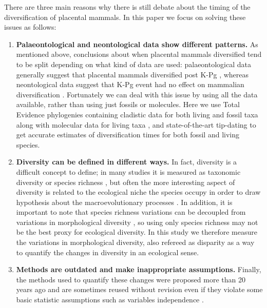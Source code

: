 \documentclass[12pt,letterpaper]{article}
\begin{document}
There are three main reasons why there is still debate about the timing of the diversification of placental mammals. In this paper we focus on solving these issues as follows: %
  \begin{enumerate}
    \item \textbf{Palaeontological and neontological data show different patterns.}
    As mentioned above, conclusions about when placental mammals diversified tend to be split depending on what kind of data are used: palaeontological data generally suggest that placental mammals diversified post K-Pg \citep[e.g.][]{O'Leary08022013}, whereas neontological data suggest that K-Pg event had no effect on mammalian diversification \citep{bininda2007delayed,meredithimpacts2011,Stadler12042011}. 
    Fortunately we can deal with this issue by using all the data available, rather than using just fossils or molecules. 
    Here we use Total Evidence phylogenies containing cladistic data for both living and fossil taxa along with molecular data for living taxa \citep{eernissetaxonomic1993,ronquista2012}, and state-of-the-art tip-dating \citep{ronquista2012,Wood01032013} to get accurate estimates of diversification times for both fossil and living species.
    \item \textbf{Diversity can be defined in different ways.}
    In fact, diversity is a difficult concept to define; in many studies it is measured as taxonomic diversity or species richness \citep{Stadler12042011,meredithimpacts2011,O'Leary08022013}, but often the more interesting aspect of diversity is related to the ecological niche the species occupy \citep{Wesley-Hunt2005,Brusatte12092008,toljagictriassic-jurassic2013} in order to draw hypothesis about the macroevolutionary processes \citep{Pearman2008149,OlsonRadiation,Losos2010,glor2010phylogenetic}.
    In addition, it is important to note that species richness variations can be decoupled from variations in morphological diversity \citep{slaterCetacean,ruta2013,hopkinsdecoupling2013}, so using only species richness may not be the best proxy for ecological diversity.
    In this study we therefore measure the variations in morphological diversity, also refereed as disparity \citep{Wills1994,BIJ:BIJ455,Wesley-Hunt2005,brusatte50,cisneros2010,prentice2011,anderson2012using,Hughes20082013,bentonmodels2014} as a way to quantify the changes in diversity in an ecological sense.
    \item \textbf{Methods are outdated and make inappropriate assumptions.}
    Finally, the methods used to quantify these changes were proposed more than 20 years ago \citep{Foote01071994,Wills1994} and are sometimes reused without revision even if they violate some basic statistic assumptions such as variables independence \citep{brusatte50,Brusatte12092008,cisneros2010,thorneresetting2011,prentice2011,brusattedinosaur2012,toljagictriassic-jurassic2013,ruta2013,bentonmodels2014,bensonfaunal2014}.

\end{enumerate}
\end{document}
